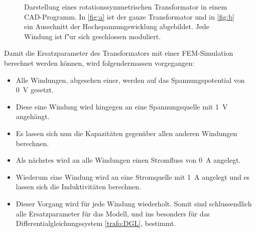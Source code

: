 \begin{refsection}
\begin{figure}
	\centering    
	\caption{Darstellung eines rotationssymmetrischen Transformator in einem CAD-Programm. In \ref{fig:a} ist der ganze Transformator und in \ref{fig:b} ein Ausschnitt der Hochspannungswicklung abgebildet. Jede Windung ist f"ur sich geschlossen moduliert.}
	\label{trafo:infolytica}
\end{figure}

Damit die Ersatzparameter des Transformators mit einer FEM-Simulation berechnet werden können, wird folgendermassen vorgegangen:
\begin{itemize}
	\item Alle Windungen, abgesehen einer, werden auf das Spannungspotential von  \SI{0}{\volt} gesetzt. 
	\item Diese eine Windung wird hingegen an eine Spannungsquelle mit \SI{1}{\volt} angehängt.
	\item Es lassen sich nun die Kapazitäten gegenüber allen anderen Windungen berechnen.
	\item Als nächstes wird an alle Windungen einen Stromfluss von \SI{0}{\ampere} angelegt.
	\item Wiederum eine Windung wird an eine Stromquelle mit \SI{1}{\ampere} angelegt und es lassen sich die Induktivitäten berechnen.
	\item Dieser Vorgang wird für jede Windung wiederholt. Somit sind schlussendlich alle Ersatzparameter für das Modell, und ins besonders für das Differentialgleichungssystem \ref{trafo:DGL}, bestimmt.
\end{itemize}



\end{refsection}
